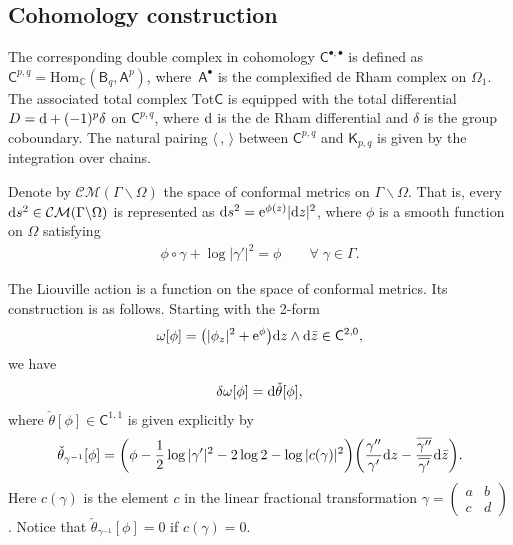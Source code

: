 \documentclass[10pt,a4paper]{amsart}
\numberwithin{equation}{section}
\newcommand{\ov}{\overline}
\newcommand{\di}{\displaystyle}
\begin{document}
\subsection{Cohomology construction}%

The corresponding double complex in cohomology $\mathsf{C}^{\bullet, \bullet}$ is defined as $\mathsf{C}^{p, q}=\text{Hom}_{\mathbb{C}}\left(\mathsf{B}_q, \mathsf{A}^p\right)$, where~$\mathsf{A}^{\bullet}$ is the complexified de Rham complex on $\Omega_1$. The associated total complex $\text{Tot} \mathsf{C}$ is equipped with the total differential $D={\rm d}+(-1)^p\delta$ on $\mathsf{C}^{p, q}$, where ${\rm d}$ is the de Rham differential and $\delta$ is the group coboundary. The natural pairing $\langle \, , \, \rangle$ between $\mathsf{C}^{p, q}$ and $\mathsf{K}_{p, q}$ is given by the integration over chains.

Denote by $\mathcal{CM}(\Gamma\backslash \Omega )$ the space of conformal metrics on $\Gamma\backslash\Omega$. That is, every ${\rm d}s^2\in \mathcal{CM}(\Gamma\backslash \Omega)$ is represented as ${\rm d}s^2={\rm e}^{\phi(z)}|{\rm d}z|^2$, where $\phi$ is a smooth function on $\Omega$ satisfying
\begin{gather}\label{e:phi-behave}
\phi\circ\gamma+\log|\gamma'|^2=\phi\quad\quad\forall \;\gamma\in\Gamma.
\end{gather}

 The Liouville action is a function on the space of conformal metrics. Its construction is as follows.
Starting with the 2-form
\begin{gather*} %
\omega[\phi] = \big(|\phi_{z}|^2 +{\rm e}^{\phi}\big){\rm d}z\wedge {\rm d}\bar{z}\in \mathsf{C}^{2,0},
\end{gather*}
we have
\begin{gather*}
\delta\omega[\phi]={\rm d}\check{\theta}[\phi],
\end{gather*}
where $\check{\theta}[\phi] \in \mathsf{C}^{1,1}$ is given explicitly by
\begin{gather*} %
\check{\theta}_{\gamma^{-1}}[\phi]
= \bigg(\phi -\frac{1}{2}\log|\gamma'|^2-2\log 2-\log|c(\gamma)|^2\bigg)
\bigg(\frac{\gamma''}{\gamma'} {\rm d}z -\frac{\ov{\gamma''}}{\ov{\gamma'}}{\rm d}\bar{z}\bigg).
\end{gather*}
Here $c(\gamma)$ is the element $c$ in the linear fractional transformation $\di\gamma=\left(\begin{smallmatrix} a & b\\c & d\end{smallmatrix}\right)\!$. Notice that \mbox{$\check{\theta}_{\gamma^{-1}}[\phi]=0$} if $c(\gamma)=0$.
\end{document}

